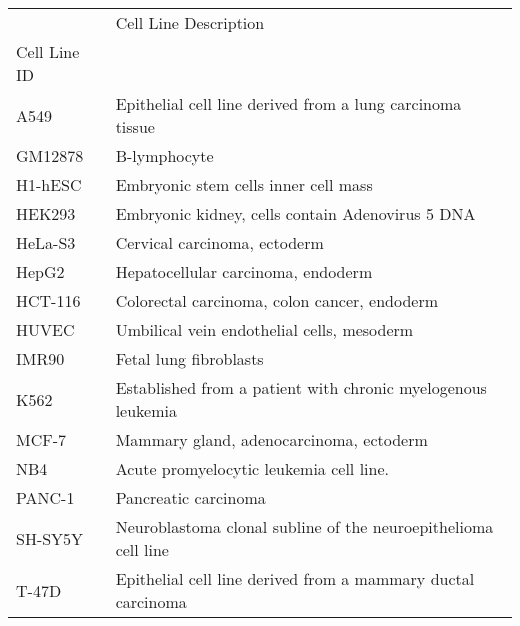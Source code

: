 \begin{tabular}{ll}
\toprule
{} &                                           Cell Line Description \\
Cell Line ID &                                                                 \\
\midrule
A549         &  Epithelial cell line derived from a lung carcinoma tissue \\
GM12878      &  B-lymphocyte \\
H1-hESC      &  Embryonic stem cells inner cell mass \\
HEK293       &  Embryonic kidney, cells contain Adenovirus 5 DNA \\
HeLa-S3      &  Cervical carcinoma, ectoderm \\
HepG2        &  Hepatocellular carcinoma, endoderm \\
HCT-116      &  Colorectal carcinoma, colon cancer, endoderm \\
HUVEC        &  Umbilical vein endothelial cells, mesoderm \\
IMR90        &  Fetal lung fibroblasts \\
K562         &  Established from a patient with chronic myelogenous leukemia \\
MCF-7        &  Mammary gland, adenocarcinoma, ectoderm \\
NB4          &  Acute promyelocytic leukemia cell line. \\
PANC-1       &  Pancreatic carcinoma \\
SH-SY5Y      &  Neuroblastoma clonal subline of the neuroepithelioma cell line \\
T-47D        &  Epithelial cell line derived from a mammary ductal carcinoma \\
\bottomrule
\end{tabular}
